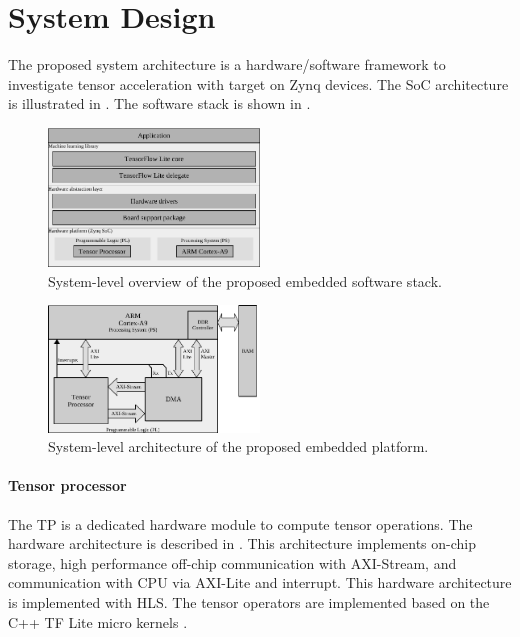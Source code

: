 \section{System Design}
\label{sec:system_design}
The proposed system architecture is a hardware/software framework to investigate tensor acceleration with target on Zynq devices. The SoC architecture is illustrated in . The software stack is shown in .

\begin{figure}[t!]
	\centering
	\includegraphics[width=0.5\textwidth]{../figures/sw_stack.pdf}
	\caption{System-level overview of the proposed embedded software stack.}
	\label{fig:sw_stack}
\end{figure}

\begin{figure}[t!]
	\centering
	\includegraphics[width=0.5\textwidth]{../figures/system_design.pdf}
	\caption{System-level architecture of the proposed embedded platform.}
	\label{fig:system_architecture}
\end{figure}

\paragraph{Tensor processor}
The TP is a dedicated hardware module to compute tensor operations. The hardware architecture is described in . This architecture implements on-chip storage, high performance off-chip communication with AXI-Stream, and communication with CPU via AXI-Lite and interrupt. This hardware architecture is implemented with HLS. The tensor operators are implemented based on the C++ TF Lite micro kernels \cite{tfLiteMicro}.

